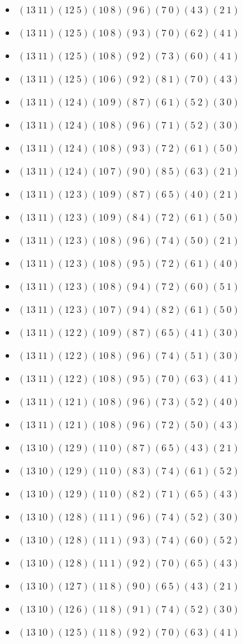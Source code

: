 \documentclass{article}
\begin{document}
\begin{itemize}
\item $(13\ 11)(12\ 5)(10\ 8)(9\ 6)(7\ 0)(4\ 3)(2\ 1)$
\item $(13\ 11)(12\ 5)(10\ 8)(9\ 3)(7\ 0)(6\ 2)(4\ 1)$
\item $(13\ 11)(12\ 5)(10\ 8)(9\ 2)(7\ 3)(6\ 0)(4\ 1)$
\item $(13\ 11)(12\ 5)(10\ 6)(9\ 2)(8\ 1)(7\ 0)(4\ 3)$
\item $(13\ 11)(12\ 4)(10\ 9)(8\ 7)(6\ 1)(5\ 2)(3\ 0)$
\item $(13\ 11)(12\ 4)(10\ 8)(9\ 6)(7\ 1)(5\ 2)(3\ 0)$
\item $(13\ 11)(12\ 4)(10\ 8)(9\ 3)(7\ 2)(6\ 1)(5\ 0)$
\item $(13\ 11)(12\ 4)(10\ 7)(9\ 0)(8\ 5)(6\ 3)(2\ 1)$
\item $(13\ 11)(12\ 3)(10\ 9)(8\ 7)(6\ 5)(4\ 0)(2\ 1)$
\item $(13\ 11)(12\ 3)(10\ 9)(8\ 4)(7\ 2)(6\ 1)(5\ 0)$
\item $(13\ 11)(12\ 3)(10\ 8)(9\ 6)(7\ 4)(5\ 0)(2\ 1)$
\item $(13\ 11)(12\ 3)(10\ 8)(9\ 5)(7\ 2)(6\ 1)(4\ 0)$
\item $(13\ 11)(12\ 3)(10\ 8)(9\ 4)(7\ 2)(6\ 0)(5\ 1)$
\item $(13\ 11)(12\ 3)(10\ 7)(9\ 4)(8\ 2)(6\ 1)(5\ 0)$
\item $(13\ 11)(12\ 2)(10\ 9)(8\ 7)(6\ 5)(4\ 1)(3\ 0)$
\item $(13\ 11)(12\ 2)(10\ 8)(9\ 6)(7\ 4)(5\ 1)(3\ 0)$
\item $(13\ 11)(12\ 2)(10\ 8)(9\ 5)(7\ 0)(6\ 3)(4\ 1)$
\item $(13\ 11)(12\ 1)(10\ 8)(9\ 6)(7\ 3)(5\ 2)(4\ 0)$
\item $(13\ 11)(12\ 1)(10\ 8)(9\ 6)(7\ 2)(5\ 0)(4\ 3)$
\item $(13\ 10)(12\ 9)(11\ 0)(8\ 7)(6\ 5)(4\ 3)(2\ 1)$
\item $(13\ 10)(12\ 9)(11\ 0)(8\ 3)(7\ 4)(6\ 1)(5\ 2)$
\item $(13\ 10)(12\ 9)(11\ 0)(8\ 2)(7\ 1)(6\ 5)(4\ 3)$
\item $(13\ 10)(12\ 8)(11\ 1)(9\ 6)(7\ 4)(5\ 2)(3\ 0)$
\item $(13\ 10)(12\ 8)(11\ 1)(9\ 3)(7\ 4)(6\ 0)(5\ 2)$
\item $(13\ 10)(12\ 8)(11\ 1)(9\ 2)(7\ 0)(6\ 5)(4\ 3)$
\item $(13\ 10)(12\ 7)(11\ 8)(9\ 0)(6\ 5)(4\ 3)(2\ 1)$
\item $(13\ 10)(12\ 6)(11\ 8)(9\ 1)(7\ 4)(5\ 2)(3\ 0)$
\item $(13\ 10)(12\ 5)(11\ 8)(9\ 2)(7\ 0)(6\ 3)(4\ 1)$

\end{itemize}
\end{document}
